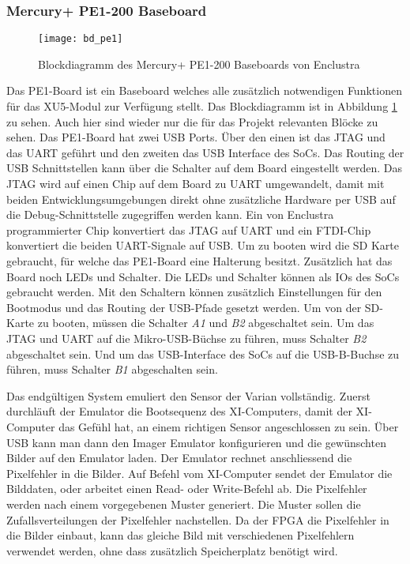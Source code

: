 \subsubsection*{Mercury+ PE1-200 Baseboard}
\begin{figure}[tb]
    \centering
    \texttt{[image: bd\_pe1]}
    \caption{Blockdiagramm des Mercury+ PE1-200 Baseboards von Enclustra}
    \label{fig:bd_pe1}
\end{figure}
Das PE1-Board ist ein Baseboard welches alle zusätzlich notwendigen Funktionen für das XU5-Modul zur Verfügung stellt.
Das Blockdiagramm ist in Abbildung \ref{fig:bd_pe1} zu sehen. Auch hier sind wieder nur die für das Projekt relevanten Blöcke zu sehen. 
Das PE1-Board hat zwei USB Ports. Über den einen ist das JTAG und das UART geführt und den zweiten das USB Interface des SoCs. Das Routing der USB Schnittstellen kann über die Schalter auf dem Board eingestellt werden. Das JTAG wird auf einen Chip auf dem Board zu UART umgewandelt, damit mit beiden Entwicklungsumgebungen direkt ohne zusätzliche Hardware per USB auf die Debug-Schnittstelle zugegriffen werden kann. Ein von Enclustra programmierter Chip konvertiert das JTAG auf UART und ein FTDI-Chip konvertiert die beiden UART-Signale auf USB. Um zu booten wird die SD Karte gebraucht, für welche das PE1-Board eine Halterung besitzt. Zusätzlich hat das Board noch LEDs und Schalter. Die LEDs und Schalter können als IOs des SoCs gebraucht werden. Mit den Schaltern können zusätzlich Einstellungen für den Bootmodus und das Routing der USB-Pfade gesetzt werden. Um von der SD-Karte zu booten, müssen die Schalter \textit{A1} und \textit{B2} abgeschaltet sein. Um das JTAG und UART auf die Mikro-USB-Büchse zu führen, muss Schalter \textit{B2} abgeschaltet sein. Und um das USB-Interface des SoCs auf die USB-B-Buchse zu führen, muss Schalter \textit{B1} abgeschalten sein. \cite{pe1}




Das endgültigen System emuliert den Sensor der Varian vollständig. Zuerst durchläuft der Emulator die Bootsequenz des XI-Computers, damit der XI-Computer das Gefühl hat, an einem richtigen Sensor angeschlossen zu sein. Über USB kann man dann den Imager Emulator konfigurieren und die gewünschten Bilder auf den Emulator laden. Der Emulator rechnet anschliessend die Pixelfehler in die Bilder. Auf Befehl vom XI-Computer sendet der Emulator die Bilddaten, oder arbeitet einen Read- oder Write-Befehl ab. Die Pixelfehler werden nach einem vorgegebenen Muster generiert. Die Muster sollen die Zufallsverteilungen der Pixelfehler nachstellen. Da der FPGA die Pixelfehler in die Bilder einbaut, kann das gleiche Bild mit verschiedenen Pixelfehlern verwendet werden, ohne dass zusätzlich Speicherplatz benötigt wird.

